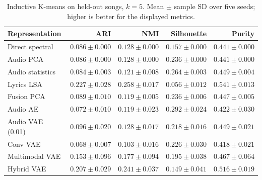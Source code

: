 \begin{table}[htbp]
\centering
\caption{Inductive K-means on held-out songs, $k=5$. Mean $\pm$ sample SD over five seeds; higher is better for the displayed metrics.}
\label{tab:main}
\small
\begin{tabular}{lrrrr}
\toprule
Representation & ARI & NMI & Silhouette & Purity \\
\midrule
Direct spectral & $0.086\pm0.000$ & $0.128\pm0.000$ & $0.157\pm0.000$ & $0.441\pm0.000$ \\
Audio PCA & $0.086\pm0.000$ & $0.128\pm0.000$ & $0.236\pm0.000$ & $0.441\pm0.000$ \\
Audio statistics & $0.084\pm0.003$ & $0.121\pm0.008$ & $0.264\pm0.003$ & $0.449\pm0.004$ \\
Lyrics LSA & $0.227\pm0.028$ & $0.258\pm0.017$ & $0.056\pm0.012$ & $0.541\pm0.013$ \\
Fusion PCA & $0.089\pm0.010$ & $0.119\pm0.005$ & $0.236\pm0.006$ & $0.447\pm0.005$ \\
Audio AE & $0.072\pm0.010$ & $0.119\pm0.023$ & $0.292\pm0.024$ & $0.422\pm0.030$ \\
Audio VAE (0.01) & $0.096\pm0.020$ & $0.128\pm0.017$ & $0.218\pm0.016$ & $0.449\pm0.021$ \\
Conv VAE & $0.068\pm0.007$ & $0.103\pm0.016$ & $0.226\pm0.030$ & $0.418\pm0.021$ \\
Multimodal VAE & $0.153\pm0.096$ & $0.177\pm0.094$ & $0.195\pm0.038$ & $0.467\pm0.064$ \\
Hybrid VAE & $0.207\pm0.029$ & $0.241\pm0.037$ & $0.149\pm0.041$ & $0.516\pm0.019$ \\
\bottomrule
\end{tabular}
\end{table}

